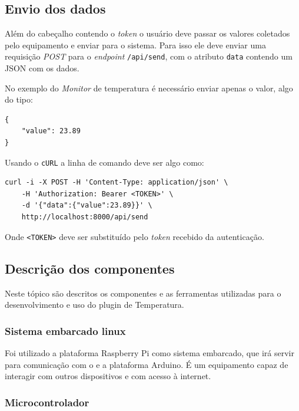 \subsection{Envio dos dados}\label{envio-dos-dados}

Além do cabeçalho contendo o \emph{token} o usuário deve passar os
valores coletados pelo equipamento e enviar para o sistema. Para isso
ele deve enviar uma requisição \emph{POST} para o \emph{endpoint}
\texttt{/api/send}, com o atributo \texttt{data} contendo um JSON com os
dados.

No exemplo do \emph{Monitor} de temperatura é necessário enviar apenas o
valor, algo do tipo:

\begin{verbatim}
{
    "value": 23.89
}
\end{verbatim}

Usando o \texttt{cURL} a linha de comando deve ser algo como:

\begin{verbatim}
curl -i -X POST -H 'Content-Type: application/json' \
    -H 'Authorization: Bearer <TOKEN>' \
    -d '{"data":{"value":23.89}}' \
    http://localhost:8000/api/send
\end{verbatim}

Onde \texttt{\textless{}TOKEN\textgreater{}} deve ser substituído pelo
\emph{token} recebido da autenticação.

\subsection{Descrição dos
componentes}\label{descriuxe7uxe3o-dos-componentes}

Neste tópico são descritos os componentes e as ferramentas utilizadas
para o desenvolvimento e uso do plugin de Temperatura.

\subsubsection{Sistema embarcado linux}\label{sistema-embarcado-linux}

Foi utilizado a plataforma Raspberry Pi como sistema embarcado, que irá
servir para comunicação com o \wm e a plataforma Arduino. É um
equipamento \iot
capaz de interagir com outros dispositivos e com acesso à internet.

\subsubsection{Microcontrolador}\label{microcontrolador}

